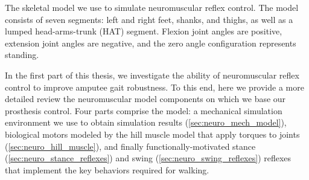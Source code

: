 \begin{marginfigure}
    \caption[The skeletal model we use to simulate neuromuscular reflex
    control]{The skeletal model we use to simulate neuromuscular reflex control.
    The model consists of seven segments: left and right feet, shanks, and
    thighs, as well as a lumped head-arms-trunk (HAT) segment. Flexion joint
    angles are positive, extension joint angles are negative, and the zero angle
    configuration represents standing.}
    \label{fig:neuro_seven_link}
\end{marginfigure}

In the first part of this thesis, we investigate the ability of neuromuscular
reflex control to improve amputee gait robustness. To this end, here we provide
a more detailed review the neuromuscular model components on which we base our
prosthesis control. Four parts comprise the model: a mechanical simulation
environment we use to obtain simulation results (\cref{sec:neuro_mech_model}),
biological motors modeled by the hill muscle model that apply torques to joints
(\cref{sec:neuro_hill_muscle}), and finally functionally-motivated stance
(\cref{sec:neuro_stance_reflexes}) and swing (\cref{sec:neuro_swing_reflexes})
reflexes that implement the key behaviors required for walking.





